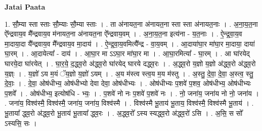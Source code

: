\documentclass[17pt]{extarticle}
\begin{document}
\textbf{Jatai Paata} \newline

1. सौ॒म्या स्ता स्ताः सौ॒म्याः सौ॒म्या स्ताः । . ता अ॑नायत॒ना अ॑नायत॒ना स्ता स्ता अ॑नायत॒नाः । . अ॒ना॒य॒त॒ना ऐ᳚न्द्रवाय॒व मै᳚न्द्रवाय॒व म॑नायत॒ना अ॑नायत॒ना ऐ᳚न्द्रवाय॒वम् । . अ॒ना॒य॒त॒ना इत्य॑ना - य॒त॒नाः । . ऐ॒न्द्र॒वा॒य॒व मा॒दाया॒दा यै᳚न्द्रवाय॒व मै᳚न्द्रवाय॒व मा॒दाय॑ । . ऐ॒न्द्र॒वा॒य॒वमित्यै᳚न्द्र - वा॒य॒वम् । . आ॒दाया॑घा॒र मा॑घा॒र मा॒दाया॒ दाया॑ घा॒रम् । . आ॒दायेत्या᳚ - दाय॑ । . आ॒घा॒र मा ऽऽघा॒र मा॑घा॒र मा । . आ॒घा॒रमित्या᳚ - घा॒रम् । . आ घा॑रयेद् घारये॒दा घा॑रयेत् । . घा॒र॒ये॒ द॒द्ध्व॒रो अ॑द्ध्व॒रो घा॑रयेद् घारये दद्ध्व॒रः । . अ॒द्ध्व॒रो य॒ज्ञो य॒ज्ञो अ॑द्ध्व॒रो अ॑द्ध्व॒रो य॒ज्ञ्ः । . य॒ज्ञो॑ ऽय म॒यं ॅय॒ज्ञो य॒ज्ञो॑ ऽयम् । . अ॒य म॑स्त्व स्त्व॒य म॒य म॑स्तु । . अ॒स्तु॒ दे॒वा॒ दे॒वा॒ अ॒स्त्व॒ स्तु॒ दे॒वाः॒ । . दे॒वा॒ ओष॑धीभ्य॒ ओष॑धीभ्यो देवा देवा॒ ओष॑धीभ्यः । . ओष॑धीभ्यः प॒शवे॑ प॒शव॒ ओष॑धीभ्य॒ ओष॑धीभ्यः प॒शवे᳚ । . ओष॑धीभ्य॒ इत्योष॑धि - भ्यः॒ । . प॒शवे॑ नो नः प॒शवे॑ प॒शवे॑ नः । . नो॒ जना॑य॒ जना॑य नो नो॒ जना॑य । . जना॑य॒ विश्व॑स्मै॒ विश्व॑स्मै॒ जना॑य॒ जना॑य॒ विश्व॑स्मै । . विश्व॑स्मै भू॒ताय॑ भू॒ताय॒ विश्व॑स्मै॒ विश्व॑स्मै भू॒ताय॑ । . भू॒ताया᳚ द्ध्व॒रो अ॑द्ध्व॒रो भू॒ताय॑ भू॒ताया᳚ द्ध्व॒रः । . अ॒द्ध्व॒रो᳚ ऽस्य स्यद्ध्व॒रो अ॑द्ध्व॒रो॑ ऽसि । . अ॒सि॒ स सो᳚ ऽस्यसि॒ सः । \newline
\end{document}
